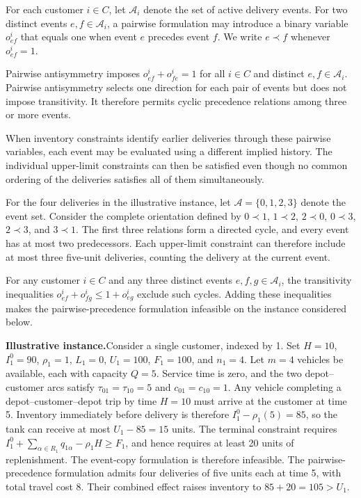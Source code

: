 \documentclass[10pt]{article}
\newcommand{\evidencebox}[1]{%
  \par\vspace{3pt}\noindent
  \colorbox{orlight}{%
    \parbox{\dimexpr\linewidth-2\fboxsep\relax}{%
      \small\textbf{Illustrative instance.}\hspace{0.35em}#1%
    }%
  }\par\vspace{4pt}
}
\begin{document}
For each customer $i\in C$, let $\mathcal A_i$ denote the set of active delivery events. For two distinct events $e,f\in\mathcal A_i$, a pairwise formulation may introduce a binary variable $o^i_{ef}$ that equals one when event $e$ precedes event $f$. We write $e\prec f$ whenever $o^i_{ef}=1$.

Pairwise antisymmetry imposes $o^i_{ef}+o^i_{fe}=1$ for all $i\in C$ and distinct $e,f\in\mathcal A_i$. Pairwise antisymmetry selects one direction for each pair of events but does not impose transitivity. It therefore permits cyclic precedence relations among three or more events.

When inventory constraints identify earlier deliveries through these pairwise variables, each event may be evaluated using a different implied history. The individual upper-limit constraints can then be satisfied even though no common ordering of the deliveries satisfies all of them simultaneously.

For the four deliveries in the illustrative instance, let $\mathcal A=\{0,1,2,3\}$ denote the event set. Consider the complete orientation defined by $0\prec1$, $1\prec2$, $2\prec0$, $0\prec3$, $2\prec3$, and $3\prec1$. The first three relations form a directed cycle, and every event has at most two predecessors. Each upper-limit constraint can therefore include at most three five-unit deliveries, counting the delivery at the current event.

For any customer $i\in C$ and any three distinct events $e,f,g\in\mathcal A_i$, the transitivity inequalities $o^i_{ef}+o^i_{fg}\le1+o^i_{eg}$ exclude such cycles. Adding these inequalities makes the pairwise-precedence formulation infeasible on the instance considered below.

\evidencebox{Consider a single customer, indexed by 1. Set $H=10$, $I_1^0=90$, $\rho_1=1$, $L_1=0$, $U_1=100$, $F_1=100$, and $n_1=4$. Let $m=4$ vehicles be available, each with capacity $Q=5$. Service time is zero, and the two depot--customer arcs satisfy $\tau_{01}=\tau_{10}=5$ and $c_{01}=c_{10}=1$. Any vehicle completing a depot--customer--depot trip by time $H=10$ must arrive at the customer at time 5. Inventory immediately before delivery is therefore $I_1^0-\rho_1(5)=85$, so the tank can receive at most $U_1-85=15$ units. The terminal constraint requires $I_1^0+\sum_{\alpha\in R_1}q_{1\alpha}-\rho_1H\ge F_1$, and hence requires at least 20 units of replenishment. The event-copy formulation is therefore infeasible. The pairwise-precedence formulation admits four deliveries of five units each at time 5, with total travel cost $8$. Their combined effect raises inventory to $85+20=105>U_1$.}
\end{document}
